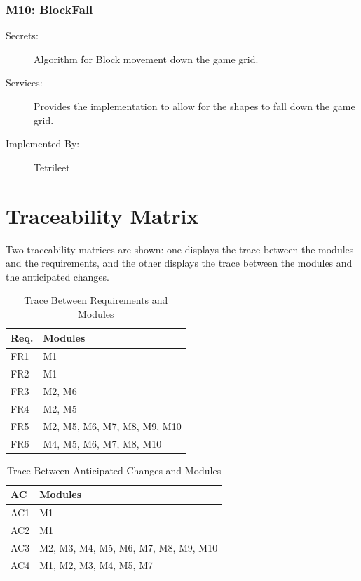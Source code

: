 \documentclass[12pt, titlepage]{article}
\begin{document}
\subsubsection{M10: BlockFall}

\begin{description}
\item[Secrets:]Algorithm for Block movement down the game grid.
\item[Services:]Provides the implementation to allow for the shapes to fall down the game grid.
\item[Implemented By:] Tetrileet
\end{description}


\section{Traceability Matrix} \label{SecTM}

Two traceability matrices are shown:
one displays the trace between the modules and the
requirements, and the other displays the trace between the modules and the anticipated changes.

\begin{table}[H]
\centering
\begin{tabular}{p{} p{}}
\toprule
\textbf{Req.} & \textbf{Modules}\\
\midrule
FR1 & M1\\
FR2 & M1\\
FR3 & M2, M6\\
FR4 & M2, M5\\
FR5 & M2, M5, M6, M7, M8, M9, M10\\
FR6 & M4, M5, M6, M7, M8, M10\\
\bottomrule
\end{tabular}
\caption{Trace Between Requirements and Modules}
\label{TblRT}
\end{table}

\begin{table}[H]
\centering
\begin{tabular}{p{} p{}}
\toprule
\textbf{AC} & \textbf{Modules}\\
\midrule
AC1 & M1\\
AC2 & M1\\
AC3 & M2, M3, M4, M5, M6, M7, M8, M9, M10\\
AC4 & M1, M2, M3, M4, M5, M7\\

\bottomrule
\end{tabular}
\caption{Trace Between Anticipated Changes and Modules}
\label{TblACT}
\end{table}
\end{document}
